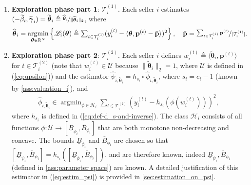 \documentclass{article} %
\def\eqref#1{equation~\ref{#1}}
\renewcommand{\eqref}[1]{(\ref{#1})}
\begin{document}
\begin{enumerate}[leftmargin=*, label=(\arabic*)]
\item\textbf{Exploration phase part 1}: $\mathcal{T}_i^{(1)}$. Each seller $i$ estimates $(-\widetilde{\beta}_i,\widetilde{\boldsymbol{\gamma}}_i) = \widetilde{\boldsymbol{\theta}}_{i} \triangleq \nicefrac{\widehat{\boldsymbol{\theta}}_{i}}{\|\widehat{\boldsymbol{\theta}}_{i}\|_2}$, where
\begin{align}\label{eq:estim_theta}
\textstyle  \widehat{\boldsymbol{\theta}}_{i}=\underset{\boldsymbol{\theta} \in \mathbb{R}^N}{\operatorname{argmin}} \left\{ \mathscr{L}_i(\boldsymbol{\theta})\triangleq \sum_{t \in \mathcal{T}_i^{(1)}}(y_i^{(t)}-\langle\boldsymbol{\theta},\mathbf{p}^{(t)}- \bar{\mathbf{p}}\rangle)^2\right\},\quad \bar{\mathbf{p}} = \nicefrac{\sum_{t \in \mathcal{T}_i^{(1)}} \mathbf{p}^{(t)}}{|\mathcal{T}_i^{(1)}|}.
\end{align}


\item\textbf{Exploration phase part 2}: $\mathcal{T}_i^{(2)}$. Each seller $i$ defines $w^{(t)}_i \triangleq  \langle\widetilde{\boldsymbol{\theta}}_{i},\textbf{p}^{(t)}\rangle$ for $t \in \mathcal{T}_i^{(2)}$ (note that $w_i^{(t)}\in \mathcal{U}$ because $\|\widetilde{\boldsymbol{\theta}}_i\|_2=1$, where $\mathcal{U}$ is defined in \eqref{eq:upsilon}) and  the estimator $\widehat{\psi}_{i,\widetilde{\boldsymbol{\theta}}_i} = h_{s_i}\circ \widehat{\phi}_{i,\widetilde{\boldsymbol{\theta}}_i}$, where $s_i = c_i-1$ (known by \cref{ass:valuation_i}), and
\begin{align}\label{eq:estim_psi}
\textstyle 
 \widehat{\phi}_{i,\widetilde{\boldsymbol{\theta}}_i} \in \operatorname{argmin}_{\phi \in \mathcal{H}_i} \sum_{t\in \mathcal{T}_i^{(2)}}(y_i^{(t)} -h_{s_i}(\phi(w^{(t)}_i)))^2,
\end{align}
where \(h_{s_i}\) is defined in \eqref{eq:def-d_s-and-inverse}. The class \(\mathcal{H}_i\) consists of all functions \(\phi: \mathcal{U} \to [\underline{B}_{\phi_i}, \bar{B}_{\phi_i}]\) that are both monotone non-decreasing and concave. The bounds \(\underline{B}_{\phi_i}\) and \(\bar{B}_{\phi_i}\) are chosen so that $[\underline{B}_{\psi_i}, \bar{B}_{\psi_i}] = h_{s_i}([\underline{B}_{\phi_i}, \bar{B}_{\phi_i}])$, and are therefore known, indeed $\underline{B}_{\psi_i}, \bar{B}_{\psi_i}$ (defined in \cref{ass:parameter space}) are known. A detailed justification of this estimator in \eqref{eq:estim_psi} is provided in \cref{sec:estimation_on_psi}.

\end{enumerate}
\end{document}
